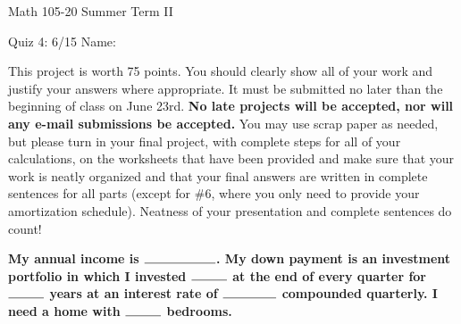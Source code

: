 \documentclass[11pt,epsfig]{article}
\begin{document}
Math 105-20 Summer Term II 

Quiz 4: 6/15 \hspace{1.9in} {Name:} {\underline {\hspace{3.5in}}}
\vspace{2pc}

This project is worth 75 points. You should clearly show all of your work and justify your answers where appropriate. It must be submitted no later than the beginning of class on June 23rd. \textbf{No late projects will be accepted, nor will any e-mail submissions be accepted.} You may use scrap paper as needed, but please turn in your final project, with complete steps for all of your calculations, on the worksheets that have been provided and make sure that your work is neatly organized and that your final answers are written in complete sentences for all parts (except for \#6, where you only need to provide your amortization schedule). Neatness of your presentation and complete sentences do count! \wl


\noindent \textbf{My annual income is $\rule{2cm}{0.15mm}$. My down payment is an investment portfolio in which I invested $\rule{1cm}{0.15mm}$ at the end of every quarter for $\rule{1cm}{0.15mm}$ years at an interest rate of $\rule{1.5cm}{0.15mm}$ compounded quarterly. I need a home with $\rule{1cm}{0.15mm}$ bedrooms.}
\vspace{2pc}
\end{document}
